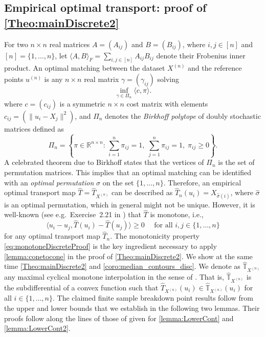 \documentclass[11pt]{article}
\newcommand{\R}{\mathbb{R}}
\theoremstyle{plain}
\theoremstyle{definition}
\begin{document}
\subsection{Empirical optimal transport: proof of \autoref{Theo:mainDiscrete2}}\label{Sect:proofDisc}
For two $n\times n$ real matrices $A=(A_{ij})$ and $B=(B_{ij})$, where $i,j\in [n]$ and $[n]=\{1,\dots, n\}$, let  $\langle A, B \rangle_F=\sum_{i,j\in [n] } A_{ij} B_{ij}$ denote their Frobenius inner product.  
An optimal matching  between the dataset $X^{(n)}$ and the reference points $u^{(n)}$  is any $n\times n$ real matrix $\gamma=(\gamma_{ij})$ solving 
\[
 \inf_{\gamma\in \Pi_n} \langle c, \pi \rangle. 
\]
where $c=(c_{ij})$ is a symmetric $n\times n$  cost matrix  with elements $c_{ij}=(\|u_i-X_j\|^2)$, and $ \Pi_{n}$ denotes the {\it Birkhoff polytope} of doubly stochastic matrices \cite{Brualdi.06} defined as 
$$
  \Pi_{n}=\left\{\pi\in { \R}^{n\times n}:\, \sum_{i=1}^n \pi_{ij}  = 1,   \; \sum_{j=1}^n \pi_{ij}=1, \; \pi_{ij}\geq 0\right\}.
$$ 
 A celebrated theorem due to Birkhoff states that the   {vertices} of   $\Pi_{n}$  is the set of permutation matrices. This implies that an optimal matching can be identified with an {\it optimal permutation} $\hat{\sigma}$ on the set $\{1, \dots, n\}$. Therefore, an empirical optimal transport map 
$\hat{T} =\hat{T}_{X^{(n)}}$  can be described as $\hat{T}_n(u_i)= X_{\hat{\sigma}(i)}$, where $\hat{\sigma}$ is an optimal permutation, which 
in general   might not be unique. However, it is well-known  {(see e.g.~Exercise~2.21 in \cite{Villani.03})} that $\hat{T}$ is monotone, i.e.,
\begin{equation}
    \label{eq:monotoneDiscreteProof}
    \langle u_i-u_j, \hat{T}(u_i)-\hat{T}(u_j)\rangle \geq 0  \quad \text{ for all }i,j\in \{1, \dots, n\}
\end{equation}
for any optimal transport map 
$\hat{T}_n $. The monotonicity property \eqref{eq:monotoneDiscreteProof} is the key ingredient necessary to apply \autoref{lemma:conetocone} in the proof of \autoref{Theo:mainDiscrete2}.  {We show at the same time \autoref{Theo:mainDiscrete2} and \autoref{coro:median_contours_disc}. We denote as $\hat{\mathbb{T}}_{X^{(n)}} $ any maximal {  cyclical} monotone interpolation in the sense of \cite{HallinDelBarrioCuestaAlbertosMatran.21}. That is, $\hat{\mathbb{T}}_{X^{(n)}} $ is the subdifferential of a convex function such that $ \hat{T}_{X^{(n)}}(u_i)\in \hat{\mathbb{T}}_{X^{(n)}} (u_i)$ for all $i\in \{1, \dots, n\}$.  }
The claimed finite sample breakdown point results follow from the  upper and lower bounds that we establish in the following two lemmas. Their proofs  follow along the lines of those of given for \autoref{lemma:LowerCont} and \autoref{lemma:LowerCont2}. 
\end{document}
